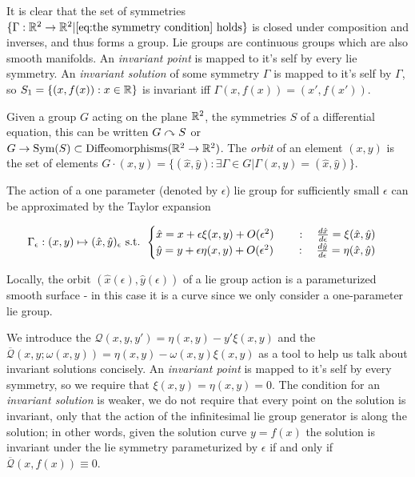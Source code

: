 \documentclass[12pt]{article}
\begin{document}
It is clear that the set of symmetries $\{\Gamma : \mathbb{R}^2\to\mathbb{R}^2 | \eqref{eq:the symmetry condition}\,\,\text{holds} \}$ is closed under composition and inverses, and thus forms a group. Lie groups are continuous groups which are also smooth manifolds. An \textit{invariant point} is mapped to it's self by every lie symmetry. An \textit{invariant solution} of some symmetry $\Gamma$ is mapped to it's self by $\Gamma$, so $S_1 = \{(x,f(x)) : x\in \mathbb{R}\}$ is invariant iff $\Gamma(x,f(x)) = (x' , f( x'))$.  

Given a group $G$ acting on the plane $\mathbb{R}^2$, the symmetries $S$ of a differential equation, this can be written $G\curvearrowright S$ or $G\to \text{Sym}(S)\subset \text{Diffeomorphisms}( \mathbb{R}^2\to\mathbb{R}^2 )$. The \textit{orbit} of an element $(x,y)$ is the set of elements $G \cdot (x,y) = \{(\hat x, \hat y) : \exists \Gamma\in G | \Gamma (x,y) = (\hat x,\hat y) \}$. 

The action of a one parameter (denoted by $\epsilon$) lie group for sufficiently small $\epsilon$ can be approximated by the Taylor expansion

\begin{equation}\label{eq:one param lie group taylor}
    \Gamma_\epsilon : (x,y)\mapsto (\hat x,\hat y)_\epsilon\text{ s.t. } \begin{cases}\hat x = x + \epsilon \xi(x,y) + O(\epsilon^2)\qquad : \quad \frac{d\hat x}{d\epsilon} = \xi(\hat x,\hat y) \\ \hat y = y + \epsilon\eta(x,y) + O(\epsilon^2) \qquad :\quad \frac{d\hat y}{d\epsilon} = \eta(\hat x,\hat y) \end{cases}
\end{equation}

Locally, the orbit $(\hat x(\epsilon),\hat y(\epsilon))$ of a lie group action is a parameturized smooth surface - in this case it is a curve since we only consider a one-parameter lie group. 

We introduce the  $\mathcal Q(x,y,y')=\eta(x,y)-y'\xi(x,y)$ and the  $\mathcal{\overline Q}(x,y;\omega(x,y)) = \eta(x,y)-\omega(x,y)\xi(x,y)$ as a tool to help us talk about invariant solutions concisely. An \textit{invariant point} is mapped to it's self by every symmetry, so we require that $\xi(x,y) = \eta(x,y) = 0$. The condition for an \textit{invariant solution} is weaker, we do not require that every point on the solution is invariant, only that the action of the infinitesimal lie group generator is along the solution; in other words, given the solution curve $y=f(x)$ the solution is invariant under the lie symmetry parameturized by $\epsilon$ if and only if $\mathcal{\overline Q}(x,f(x)) \equiv 0$. 
\end{document}
